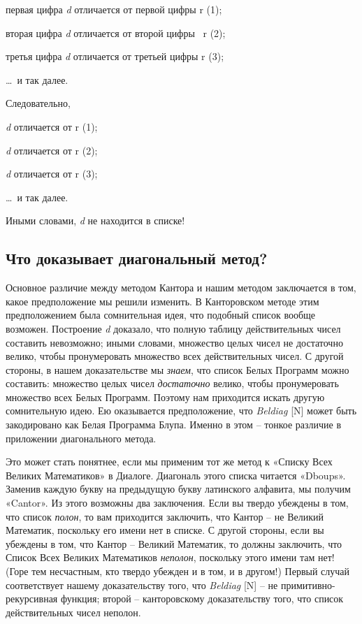 \documentclass[../main.tex]{subfiles}
\begin{document}
первая цифра \emph{d} отличается от первой цифры r (1);

вторая цифра \emph{d} отличается от второй цифры~ r (2);

третья цифра \emph{d} отличается от третьей цифры r (3);

\ldots~и так далее.

Следовательно,

\emph{d} отличается от r (1);

\emph{d} отличается от r (2);

\emph{d} отличается от r (3);

\ldots~и так далее.

Иными словами, \emph{d} не находится в списке!


\subsection{Что доказывает диагональный метод?}

Основное различие между методом Кантора и нашим методом заключается в том, какое предположение мы решили изменить. В Канторовском методе этим предположением была сомнительная идея, что подобный список вообще возможен. Построение \emph{d} доказало, что полную таблицу действительных чисел составить невозможно; иными словами, множество целых чисел не достаточно велико, чтобы пронумеровать множество всех действительных чисел. С другой стороны, в нашем доказательстве мы \emph{знаем}, что список Белых Программ можно составить: множество целых чисел \emph{достаточно} велико, чтобы пронумеровать множество всех Белых Программ. Поэтому нам приходится искать другую сомнительную идею. Ею оказывается предположение, что \emph{Beldiag} {[}N{]} может быть закодировано как Белая Программа Блупа. Именно в этом \--- тонкое различие в приложении диагонального метода.

Это может стать понятнее, если мы применим тот же метод к «Списку Всех Великих Математиков» в Диалоге. Диагональ этого списка читается «Dboups». Заменив каждую букву на предыдущую букву латинского алфавита, мы получим «Cantor». Из этого возможны два заключения. Если вы твердо убеждены в том, что список \emph{полон}, то вам приходится заключить, что Кантор \--- не Великий Математик, поскольку его имени нет в списке. С другой стороны, если вы убеждены в том, что Кантор \--- Великий Математик, то должны заключить, что Список Всех Великих Математиков \emph{неполон}, поскольку этого имени там нет! (Горе тем несчастным, кто твердо убежден и в том, и в другом!) Первый случай соответствует нашему доказательству того, что \emph{Beldiag} {[}N{]} \--- не примитивно-рекурсивная функция; второй \--- канторовскому доказательству того, что список действительных чисел неполон.
\end{document}
